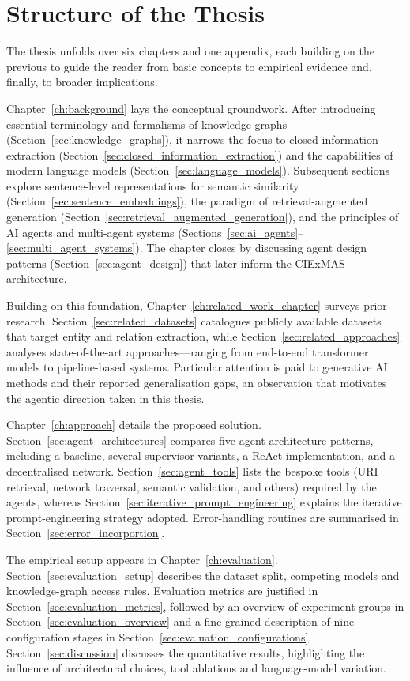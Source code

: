 \documentclass[a4paper,oneside,bibliography=totoc]{scrbook}
\begin{document}
\section{Structure of the Thesis}
\label{sec:structure}

The thesis unfolds over six chapters and one appendix, each building on the previous to guide the reader from basic concepts to empirical evidence and, finally, to broader implications.

Chapter~\ref{ch:background} lays the conceptual groundwork. After introducing essential terminology and formalisms of knowledge graphs (Section~\ref{sec:knowledge_graphs}), it narrows the focus to closed information extraction (Section~\ref{sec:closed_information_extraction}) and the capabilities of modern language models (Section~\ref{sec:language_models}). Subsequent sections explore sentence-level representations for semantic similarity (Section~\ref{sec:sentence_embeddings}), the paradigm of retrieval-augmented generation (Section~\ref{sec:retrieval_augmented_generation}), and the principles of AI agents and multi-agent systems (Sections~\ref{sec:ai_agents}–\ref{sec:multi_agent_systems}). The chapter closes by discussing agent design patterns (Section~\ref{sec:agent_design}) that later inform the CIExMAS architecture.

Building on this foundation, Chapter~\ref{ch:related_work_chapter} surveys prior research. Section~\ref{sec:related_datasets} catalogues publicly available datasets that target entity and relation extraction, while Section~\ref{sec:related_approaches} analyses state-of-the-art approaches—ranging from end-to-end transformer models to pipeline-based systems. Particular attention is paid to generative AI methods and their reported generalisation gaps, an observation that motivates the agentic direction taken in this thesis.

Chapter~\ref{ch:approach} details the proposed solution. Section~\ref{sec:agent_architectures} compares five agent-architecture patterns, including a baseline, several supervisor variants, a ReAct implementation, and a decentralised network. Section~\ref{sec:agent_tools} lists the bespoke tools (URI retrieval, network traversal, semantic validation, and others) required by the agents, whereas Section~\ref{sec:iterative_prompt_engineering} explains the iterative prompt-engineering strategy adopted. Error-handling routines are summarised in Section~\ref{sec:error_incorportion}.

The empirical setup appears in Chapter~\ref{ch:evaluation}. Section~\ref{sec:evaluation_setup} describes the dataset split, competing models and knowledge-graph access rules. Evaluation metrics are justified in Section~\ref{sec:evaluation_metrics}, followed by an overview of experiment groups in Section~\ref{sec:evaluation_overview} and a fine-grained description of nine configuration stages in Section~\ref{sec:evaluation_configurations}. Section~\ref{sec:discussion} discusses the quantitative results, highlighting the influence of architectural choices, tool ablations and language-model variation.
\end{document}

